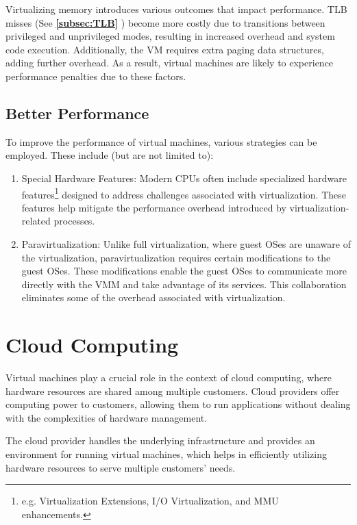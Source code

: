 \documentclass{report}
\newcommand{\corollaryBegin}[1]{\begin{tcolorbox}[colback=teal!5!white,colframe=black!75!teal,title={Corollary:
      #1}]}
\newcommand{\corollaryEnd}{\end{tcolorbox}}
\newcommand{\refto}[2]{\textbf{\ref{#1:#2} \nameref{#1:#2}}}
\begin{document}
\corollaryBegin{Outcomes}
Virtualizing memory introduces various outcomes that impact performance. TLB misses (See
\refto{subsec}{TLB}) become more costly due to transitions between privileged and unprivileged
modes, resulting in increased overhead and system code execution. Additionally, the VM requires
extra paging data structures, adding further overhead. As a result, virtual machines are likely to
experience performance penalties due to these factors.
\corollaryEnd


\subsection{Better Performance}
To improve the performance of virtual machines, various strategies can be employed. These include
(but are not limited to):

\begin{enumerate}[label=\textit{(\roman*)}]
\item Special Hardware Features: Modern CPUs often include specialized hardware
  features\footnote{e.g. Virtualization Extensions, I/O Virtualization, and MMU enhancements.}
  designed to address challenges associated with virtualization. These features help mitigate the
  performance overhead introduced by virtualization-related processes.
\item Paravirtualization: Unlike full virtualization, where guest OSes are unaware of the
  virtualization, paravirtualization requires certain modifications to the guest OSes. These
  modifications enable the guest OSes to communicate more directly with the VMM and take advantage of
  its services. This collaboration eliminates some of the overhead associated with virtualization.
\end{enumerate}





\section{Cloud Computing}
Virtual machines play a crucial role in the context of cloud computing, where hardware resources are
shared among multiple customers. Cloud providers offer computing power to customers, allowing them
to run applications without dealing with the complexities of hardware management.

The cloud provider handles the underlying infrastructure and provides an environment for running
virtual machines, which helps in efficiently utilizing hardware resources to serve multiple
customers' needs.
\end{document}
